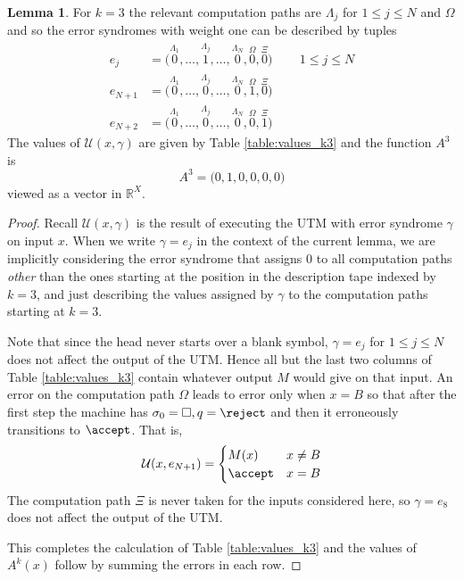 \documentclass[english,letter paper,12pt,reqno]{article}
\theoremstyle{definition}
\newtheorem{lemma}[theorem]{Lemma}
\def\be{\begin{equation}}
\def\ee{\end{equation}}
\begin{document}
\begin{lemma}\label{lemma:detectA_k3} For $k = 3$ the relevant computation paths are $\Lambda_j$ for $1 \le j \le N$ and $\Omega$ and so the error syndromes with weight one can be described by tuples
\begin{align}
e_j &= \Big(\overset{\Lambda_1}{0}, \ldots, \overset{\Lambda_j}{1}, \ldots, \overset{\Lambda_N}{0}, \overset{\Omega}{0}, \overset{\Xi}{0}\Big)\,\qquad 1 \le j \le N \label{eq:lemma_detectA_k3ej}\\
e_{N+1} &= \Big(\overset{\Lambda_1}{0}, \ldots, \overset{\Lambda_j}{0}, \ldots, \overset{\Lambda_N}{0}, \overset{\Omega}{1}, \overset{\Xi}{0}\Big)\,\\
e_{N+2} &= \Big(\overset{\Lambda_1}{0}, \ldots, \overset{\Lambda_j}{0}, \ldots, \overset{\Lambda_N}{0}, \overset{\Omega}{0}, \overset{\Xi}{1}\Big)\,\label{eq:lemma_detectA_k3enplusone}
\end{align}
The values of $\mathcal{U}(x,\gamma)$ are given by Table \ref{table:values_k3} and the function $A^3$ is
\be
A^3 = \big( 0, 1, 0, 0, 0, 0 \big)
\ee
viewed as a vector in $\mathbb{R}^X$.
\end{lemma}
\begin{proof}
Recall $\mathcal{U}(x, \gamma)$ is the result of executing the UTM with error syndrome $\gamma$ on input $x$. When we write $\gamma = e_j$ in the context of the current lemma, we are implicitly considering the error syndrome that assigns $0$ to all computation paths \emph{other} than the ones starting at the position in the description tape indexed by $k = 3$, and just describing the values assigned by $\gamma$ to the computation paths starting at $k = 3$.

Note that since the head never starts over a blank symbol, $\gamma = e_j$ for $1 \le j \le N$ does not affect the output of the UTM. Hence all but the last two columns of Table \ref{table:values_k3} contain whatever output $M$ would give on that input. An error on the computation path $\Omega$ leads to error only when $x = B$ so that after the first step the machine has $\sigma_0 = \Box, q = \reject$ and then it erroneously transitions to $\accept$. That is,
\be
\mathcal{U}(x, e_{N+1}) = \begin{cases}
   M(x) & x \neq B\\
   \accept & x = B
\end{cases}
\ee
The computation path $\Xi$ is never taken for the inputs considered here, so $\gamma = e_8$ does not affect the output of the UTM.

This completes the calculation of Table \ref{table:values_k3} and the values of $A^k(x)$ follow by summing the errors in each row.
\end{proof}
\end{document}
